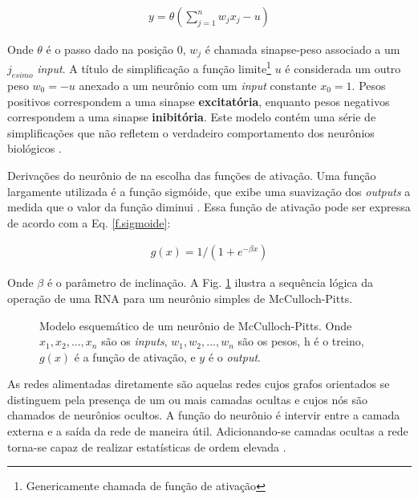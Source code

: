 \documentclass[journal, a4paper]{IEEEtran}
\begin{document}
\begin{eqnarray}
y=\theta \left( \sum^{n}_{j=1} w_{j} x_{j} -u \right)
\label{Eq.neuronio-McCulloch}
\end{eqnarray}

Onde $\theta$ é o passo dado na posição $0$, $w_{j}$ é chamada sinapse-peso associado a um $j_{esimo}$ \textit{input}. A título de simplificação a função limite\footnote{Genericamente chamada de função de ativação} $u$ é considerada um outro peso $w_{0}=-u$ anexado a um neurônio com um \textit{input} constante $x_{0}=1$. Pesos positivos correspondem a uma sinapse \textbf{excitatória}, enquanto pesos negativos correspondem a uma sinapse \textbf{inibitória}. Este modelo contém uma série de simplificações que não refletem o verdadeiro comportamento dos neurônios biológicos \citep{Mao1996}.  

Derivações do neurônio de \citet{McCulloch1943} na escolha das funções de ativação. Uma função largamente utilizada é a função sigmóide, que exibe uma suavização dos \textit{outputs} a medida que o valor da função diminui \citep{Mao1996,Misra2010}. Essa função de ativação pode ser expressa de acordo com a Eq. \ref{f.sigmoide}:

\begin{eqnarray}
g(x)=1/(1+e^{-\beta x})
\label{f.sigmoide}
\end{eqnarray}

Onde $\beta$ é o parâmetro de inclinação. A Fig. \ref{Esquematico de McCulloch} ilustra a sequência lógica da operação de uma RNA para um neurônio simples de McCulloch-Pitts. 
\\
\begin{figure}[!ht]
	\centering
	\setlength{\fboxsep}{8pt}
	\setlength{\fboxrule}{0.1pt}
	\caption{Modelo esquemático de um neurônio de McCulloch-Pitts. Onde $x_{1}, x_{2}, ..., x_{n}$ são os \textit{inputs}, $w_{1}, w_{2}, ..., w_{n}$ são os pesos, h é o treino, $g(x)$ é a função de ativação, e $y$ é o \textit{output}.}
	\label{Esquematico de McCulloch}
\end{figure}

As redes alimentadas diretamente são aquelas redes cujos grafos orientados se distinguem pela presença de um ou mais camadas ocultas e cujos nós são chamados de neurônios ocultos. A função do neurônio é intervir entre a camada externa e a saída da rede de maneira útil. Adicionando-se camadas ocultas a rede torna-se capaz de realizar estatísticas de ordem elevada \citep{Haykin1999}.
\end{document}
